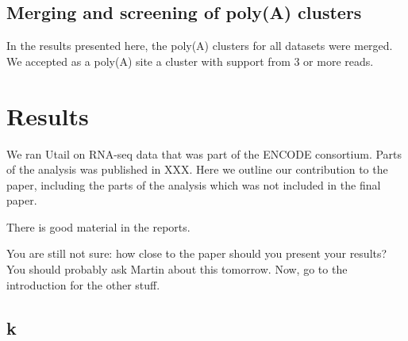 \subsection{Merging and screening of poly(A) clusters}
In the results presented here, the poly(A) clusters for all datasets were
merged. We accepted as a poly(A) site a cluster with support from 3 or more
reads.

\section{Results}
We ran Utail on RNA-seq data that was part of the ENCODE consortium. Parts of
the analysis was published in XXX. Here we outline our contribution
to the paper, including the parts of the analysis which was not included in the
final paper.

There is good material in the reports.

You are still not sure: how close to the paper should you present your results?
You should probably ask Martin about this tomorrow. Now, go to the introduction
for the other stuff.

\subsection{k}





